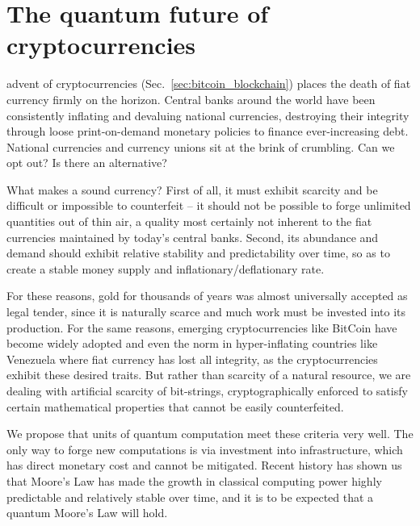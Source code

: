 %
%

\section{The quantum future of cryptocurrencies}\label{sec:quant_coin_essay}

 advent of cryptocurrencies (Sec.~\ref{sec:bitcoin_blockchain}) places the death of fiat currency firmly on the horizon. Central banks around the world have been consistently inflating and devaluing national currencies, destroying their integrity through loose print-on-demand monetary policies to finance ever-increasing debt. National currencies and currency unions sit at the brink of crumbling. Can we opt out? Is there an alternative?

What makes a sound currency? First of all, it must exhibit scarcity and be difficult or impossible to counterfeit -- it should not be possible to forge unlimited quantities out of thin air, a quality most certainly not inherent to the fiat currencies maintained by today's central banks. Second, its abundance and demand should exhibit relative stability and predictability over time, so as to create a stable money supply and inflationary/deflationary rate.

For these reasons, gold for thousands of years was almost universally accepted as legal tender, since it is naturally scarce and much work must be invested into its production. For the same reasons, emerging cryptocurrencies like BitCoin have become widely adopted and even the norm in hyper-inflating countries like Venezuela where fiat currency has lost all integrity, as the cryptocurrencies exhibit these desired traits. But rather than scarcity of a natural resource, we are dealing with artificial scarcity of bit-strings, cryptographically enforced to satisfy certain mathematical properties that cannot be easily counterfeited.

We propose that units of quantum computation meet these criteria very well. The only way to forge new computations is via investment into infrastructure, which has direct monetary cost and cannot be mitigated. Recent history has shown us that Moore's Law has made the growth in classical computing power highly predictable and relatively stable over time, and it is to be expected that a quantum Moore's Law will hold.

